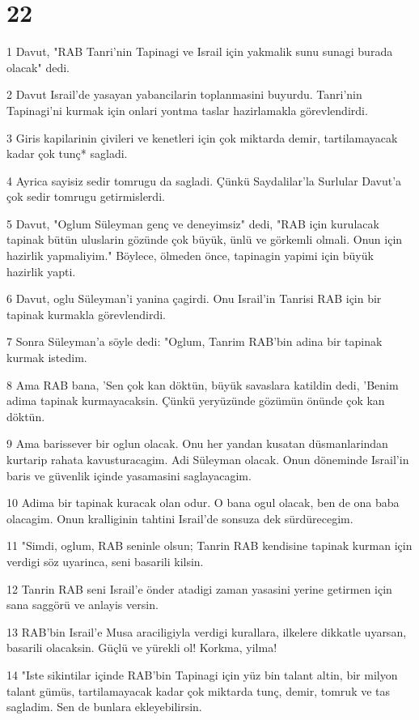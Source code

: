 \chapter{22}

\par 1 Davut, "RAB Tanri'nin Tapinagi ve Israil için yakmalik sunu sunagi burada olacak" dedi.
\par 2 Davut Israil'de yasayan yabancilarin toplanmasini buyurdu. Tanri'nin Tapinagi'ni kurmak için onlari yontma taslar hazirlamakla görevlendirdi.
\par 3 Giris kapilarinin çivileri ve kenetleri için çok miktarda demir, tartilamayacak kadar çok tunç* sagladi.
\par 4 Ayrica sayisiz sedir tomrugu da sagladi. Çünkü Saydalilar'la Surlular Davut'a çok sedir tomrugu getirmislerdi.
\par 5 Davut, "Oglum Süleyman genç ve deneyimsiz" dedi, "RAB için kurulacak tapinak bütün uluslarin gözünde çok büyük, ünlü ve görkemli olmali. Onun için hazirlik yapmaliyim." Böylece, ölmeden önce, tapinagin yapimi için büyük hazirlik yapti.
\par 6 Davut, oglu Süleyman'i yanina çagirdi. Onu Israil'in Tanrisi RAB için bir tapinak kurmakla görevlendirdi.
\par 7 Sonra Süleyman'a söyle dedi: "Oglum, Tanrim RAB'bin adina bir tapinak kurmak istedim.
\par 8 Ama RAB bana, 'Sen çok kan döktün, büyük savaslara katildin dedi, 'Benim adima tapinak kurmayacaksin. Çünkü yeryüzünde gözümün önünde çok kan döktün.
\par 9 Ama barissever bir oglun olacak. Onu her yandan kusatan düsmanlarindan kurtarip rahata kavusturacagim. Adi Süleyman olacak. Onun döneminde Israil'in baris ve güvenlik içinde yasamasini saglayacagim.
\par 10 Adima bir tapinak kuracak olan odur. O bana ogul olacak, ben de ona baba olacagim. Onun kralliginin tahtini Israil'de sonsuza dek sürdürecegim.
\par 11 "Simdi, oglum, RAB seninle olsun; Tanrin RAB kendisine tapinak kurman için verdigi söz uyarinca, seni basarili kilsin.
\par 12 Tanrin RAB seni Israil'e önder atadigi zaman yasasini yerine getirmen için sana saggörü ve anlayis versin.
\par 13 RAB'bin Israil'e Musa araciligiyla verdigi kurallara, ilkelere dikkatle uyarsan, basarili olacaksin. Güçlü ve yürekli ol! Korkma, yilma!
\par 14 "Iste sikintilar içinde RAB'bin Tapinagi için yüz bin talant altin, bir milyon talant gümüs, tartilamayacak kadar çok miktarda tunç, demir, tomruk ve tas sagladim. Sen de bunlara ekleyebilirsin.
